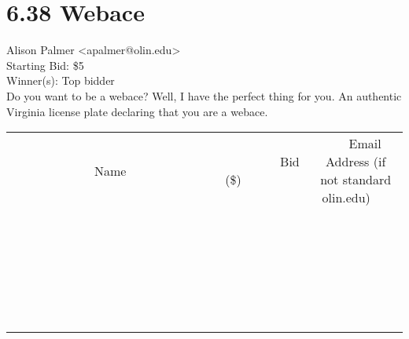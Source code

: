 \documentclass[11pt]{article}
\begin{document}
					\section*{6.38 Webace}
					Alison Palmer <apalmer@olin.edu> \\
					Starting Bid: \$5 \\
					Winner(s): Top bidder \\
					Do you want to be a webace? Well, I have the perfect thing for you. An authentic Virginia license plate declaring that you are a webace. \\
					[6ex]
					\begin{tabular}{c c c}
						~~~~~~~~~~~~~Name~~~~~~~~~~~~~ & ~~~~~~~~~Bid (\$)~~~~~~~~~ & ~~~Email Address (if not standard olin.edu)~~~ \\
				
 & & \\
\hline
 & & \\
\hline
 & & \\
\hline
 & & \\
\hline
 & & \\
\hline
 & & \\
\hline
 & & \\
\hline
 & & \\
\hline
 & & \\
\hline
 & & \\
\hline
 & & \\
\hline
 & & \\
\hline
 & & \\
\hline
 & & \\
\hline
 & & \\
\hline
 & & \\
\hline
 & & \\
\hline
 & & \\
\hline
 & & \\
\hline
 & & \\
\hline
 & & \\
\hline
 & & \\
\hline
 & & \\
\hline
 & & \\
\hline
 & & \\
\hline
 & & \\
\hline
					\end{tabular}
					\clearpage
				
\end{document}

